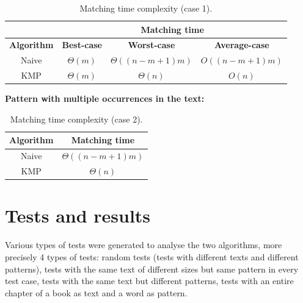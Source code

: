 \documentclass[11pt]{article}
\begin{document}
            \begin{table}[H]
                \centering
                    \begin{tabular}{|c|c|c|c|}
                        \hhline{~|---|}
                        \multicolumn{1}{c|}{}& \multicolumn{3}{c|}{\textbf{Matching time}} \\
                        \hline
                        \textbf{Algorithm} & \textbf{Best-case} & \textbf{Worst-case} & \textbf{Average-case} \\
                        \hline
                        Naive & $\Theta(m)$ & $\Theta((n-m+1)m)$ & $O((n-m+1)m)$ \\
                        \hline
                        KMP & $\Theta(m)$ & $\Theta(n)$ & $O(n)$ \\
                        \hline
                    \end{tabular}
                \caption{Matching time complexity (case 1).}
                \label{tab:matching_time_complexity_1}
            \end{table}


            \noindent \quad \textbf{Pattern with multiple occurrences in the text:}

            \begin{table}[H]
                \centering
                \begin{tabular}{|c|c|}
                    \hline
                    \textbf{Algorithm} & \textbf{Matching time} \\
                    \hline
                    Naive & $\Theta((n-m+1)m)$ \\
                    \hline
                    KMP & $\Theta(n)$ \\
                    \hline
                \end{tabular}
                \caption{Matching time complexity (case 2).}
                \label{tab:matching_time_complexity_2}
            \end{table}

    \section{Tests and results} \label{sec:tests_and_results}

        Various types of tests were generated to analyse the two algorithms, more precisely 4 types of tests:
        random tests (tests with different texts and different patterns),
        tests with the same text of different sizes but same pattern in every test case,
        tests with the same text but different patterns,
        tests with an entire chapter of a book as text and a word as pattern.
\end{document}
